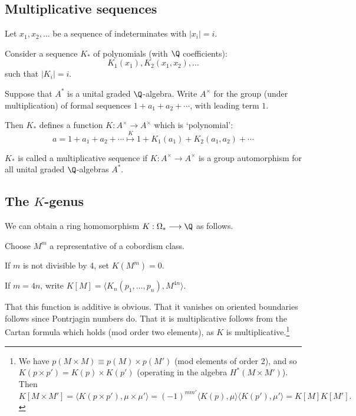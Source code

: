 \documentclass[11pt]{article}
\begin{document}
\begin{SignatureThmTalk}
\subsection*{Multiplicative sequences}
\begin{itemise}
\item Let $x_1,x_2,\ldots$ be a sequence of indeterminates with $|x_i|=i$.
\item Consider a sequence $K_*$ of polynomials (with $\Q$ coefficients):
\[K_1(x_1), K_2(x_1,x_2),\ldots\]
such that $|K_i|=i$.
\item Suppose that $A^*$ is a unital graded $\Q$-algebra. Write $A^\times$ for the group (under multiplication) of formal sequences $1+a_1+a_2+\cdots$, with leading term $1$. 
\item Then $K_*$ defines a function $K:A^\times\to A^\times$ which is `polynomial':
\[a=1+a_1+a_2+\cdots\overset{K}{\mapsto}1+K_1(a_1)+K_2(a_1,a_2)+\cdots\]
\item $K_*$ is called a multiplicative sequence if $K:A^\times\to A^\times$ is a group automorphism for all unital graded $\Q$-algebras $A^*$.
\end{itemise}
\subsection*{The $K$-genus}
We can obtain a ring homomorphism $K:\Omega_*\to \Q$ as follows.
\begin{itemise}
\item Choose $M^m$ a representative of a cobordism class. 
\item If $m$ is not divisible by 4, set $K(M^m)=0$.
\item If $m=4n$, write $K[M]=\langle K_n(p_1,\ldots,p_n),M^{4n}\rangle$.
\end{itemise}
That this function is additive is obvious. That it vanishes on oriented boundaries follows since Pontrjagin numbers do. That it is multiplicative follows from the Cartan formula which holds (mod order two elements), as $K$ is multiplicative.\footnote{We have $p(M\times M)\equiv p(M)\times p(M')$ (mod elements of order 2), and so $K(p\times p')=K(p)\times K(p')$ (operating in the algebra $H^*(M\times M')$). Then $K[M\times M']=\langle K(p\times p'),\mu\times\mu'\rangle=(-1)^{mm'}\langle K(p),\mu\rangle\langle K(p'),\mu'\rangle=K[M] K[M'].$}

\end{SignatureThmTalk}
\end{document}
